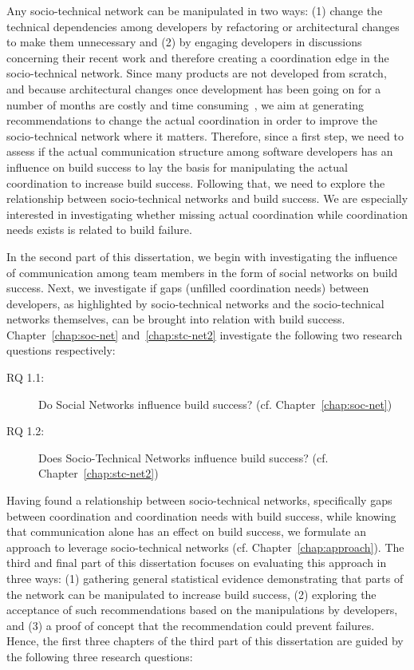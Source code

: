 Any socio-technical network can be manipulated in two ways: (1) change the technical dependencies among developers by refactoring or architectural changes to make them unnecessary and (2) by engaging developers in discussions concerning their recent work and therefore creating a coordination edge in the socio-technical network.
Since many products are not developed from scratch, and because architectural changes once development has been going on for a number of months are costly and time consuming~\cite{vangurp:jss:2002}, we aim at generating recommendations to change the actual coordination in order to improve the socio-technical network where it matters.
Therefore, since a first step, we need to assess if the actual communication structure among software developers has an influence on build success to lay the basis for manipulating the actual coordination to increase build success.
Following that, we need to explore the relationship between socio-technical networks and build success.
We are especially interested in investigating whether missing actual coordination while coordination needs exists is related to build failure.

In the second part of this dissertation, we begin with investigating the influence of communication among team members in the form of social networks on build success.
Next, we investigate if gaps (unfilled coordination needs) between developers, as highlighted by socio-technical networks and the socio-technical networks themselves, can be brought into relation with build success.
Chapter~\ref{chap:soc-net} and~\ref{chap:stc-net2} investigate the following two research questions respectively:

\begin{description}
  \item[RQ 1.1:] Do Social Networks influence build success? (cf. Chapter~\ref{chap:soc-net})
  \item[RQ 1.2:] Does Socio-Technical Networks influence build success? (cf. Chapter~\ref{chap:stc-net2})
\end{description}

Having found a relationship between socio-technical networks, specifically gaps between coordination and coordination needs with build success, while knowing that communication alone has an effect on build success, we formulate an approach to leverage socio-technical networks (cf. Chapter~\ref{chap:approach}).
The third and final part of this dissertation focuses on evaluating this approach in three ways:
(1) gathering general statistical evidence demonstrating that parts of the network can be manipulated to increase build success,
(2) exploring the acceptance of such recommendations based on the manipulations by developers,
and (3) a proof of concept that the recommendation could prevent failures.
Hence, the first three chapters of the third part of this dissertation are guided by the following three research questions:


